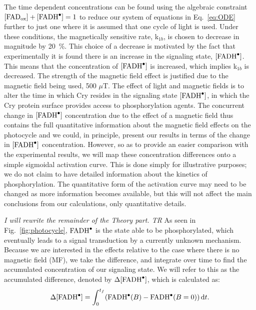 \documentclass[twoside,twocolumn,9pt]{article}
\begin{document}
The time dependent concentrations can be found using the algebraic constraint $[\text{FAD}_{\text{ox}}] + [\ce{FADH^{.}}] = 1$ to 
reduce our system of equations in Eq.~\ref{eq:ODE} further to just one where it is assumed that one cycle of light is used. Under 
these conditions, the magnetically sensitive rate, k$_{1b}$, is chosen to decrease in magnitude by 20~\%. This choice of a decrease 
is motivated \cite{Hammad2019} by the fact that experimentally it is found there is an increase in the signaling state, $ 
[\ce{FADH^{.}}]$. This means that the concentration of $[\ce{FADH^{.}}]$ is increased, which implies k$_{1b}$ is decreased. The 
strength of the magnetic field effect is justified due to the magnetic field being used, \cite{Pooam2019, Hammad2019} 500 $\mu$T.
The effect of light and magnetic fields is to alter the time in which Cry resides in the signaling state $[\ce{FADH^{.}}]$, in 
which the Cry protein surface provides access to phosphorylation agents. The concurrent change in $[\ce{FADH^{.}}]$ concentration 
due to the effect of a magnetic field thus contains the full quantitative information about the magnetic field effects on the 
photocycle and we could, in principle, present our results in terms of the change in $[\ce{FADH^{.}}]$ concentration.
However, so as to provide an easier comparison with the experimental results, we will map these concentration differences onto a 
simple sigmoidal activation curve. This is done simply for illustrative purposes; we do not claim to have detailed information 
about the kinetics of phosphorylation. The quantitative form of the activation curve may need to be changed as more information 
becomes available, but this will not affect the main conclusions from our calculations, only quantitative details.

{\em I will rewrite the remainder of the Theory part. TR}
As seen in Fig.~\ref{fig:photocycle}, $\ce{FADH^{.}}$ is the state able to be phosphorylated, which eventually leads to a signal 
transduction by a currently unknown mechanism. Because we are interested in the effects relative to the case where there is no 
magnetic field (MF), we take the difference, and integrate over time to find the accumulated concentration of our signaling state. 
We will refer to this as the accumulated difference, denoted by $\Delta [\ce{FADH^{.}}]$, which is calculated as:
\begin{equation}
	\Delta [\ce{FADH^{.}}] = \int_{0}^{t_{f}} (\ce{FADH^{.}}(B) - \ce{FADH^{.}}(B = 0)) \, \mathrm{d}t.
\end{equation}
\end{document}
